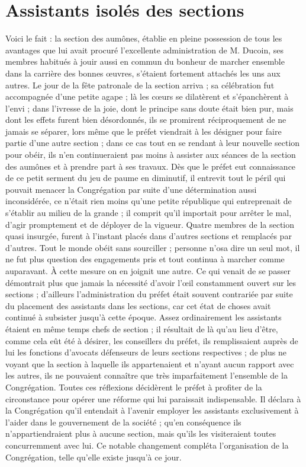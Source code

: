 \section*{Assistants isolés des sections}
Voici le fait : la section des aumônes, établie en pleine possession de tous les avantages que lui avait procuré l'excellente administration de M. Ducoin, ses membres habitués à jouir aussi en commun du bonheur de marcher ensemble dans la carrière des bonnes œuvres, s'étaient fortement attachés les uns aux autres. Le jour de la fête patronale de la section arriva ; sa célébration fut accompagnée d'une petite agape ; là les cœurs se dilatèrent et s'épanchèrent à l'envi ; dans l'ivresse de la joie, dont le principe sans doute était bien pur, mais dont les effets furent bien désordonnés, ils se promirent réciproquement de ne jamais se séparer, lors même que le préfet viendrait à les désigner pour faire partie d'une autre section ; dans ce cas tout en se rendant à leur nouvelle section pour obéir, ils n'en continueraient pas moins à assister aux séances de la section des aumônes et à prendre part à ses travaux. Dès que le préfet eut connaissance de ce petit serment du jeu de paume en diminutif, il entrevit tout le péril qui pouvait menacer la Congrégation par suite d'une détermination aussi inconsidérée, ce n'était rien moins qu'une petite république qui entreprenait de s'établir au milieu de la grande ; il comprit qu'il importait pour arrêter le mal, d'agir promptement et de déployer de la vigueur. Quatre
membres de la section quasi insurgée, furent à l'instant placés dans d'autres sections et remplacés par d'autres. Tout le monde obéit sans sourciller ; personne n'osa dire un seul mot, il ne fut plus question des engagements pris et tout continua à marcher comme auparavant. À cette mesure on en joignit une autre. Ce qui venait de se passer démontrait plus que jamais la nécessité d'avoir l'œil constamment ouvert sur les sections ; d'ailleurs l'administration du préfet était souvent contrariée par suite du placement des assistants dans les sections, car cet état de choses avait continué à subsister jusqu'à cette époque. Assez ordinairement les assistants étaient en même temps chefs de section ; il résultait de là qu'au lieu d'être, comme cela eût été à désirer, les conseillers du préfet, ils remplissaient auprès de lui les fonctions d'avocats défenseurs de leurs sections respectives ; de plus ne voyant que la section à laquelle ils appartenaient et n'ayant aucun rapport avec les autres, ils ne pouvaient connaître que très imparfaitement l'ensemble de la Congrégation. Toutes ces réflexions décidèrent le préfet à profiter de la circonstance pour opérer une réforme qui lui paraissait indispensable. Il déclara à la Congrégation qu'il entendait à l'avenir employer les assistants exclusivement à l'aider dans le gouvernement de la société ; qu'en conséquence ils n'appartiendraient plus à aucune section, mais qu'ils les visiteraient toutes concurremment avec lui. Ce notable changement compléta l'organisation de la Congrégation, telle qu'elle existe jusqu'à ce jour.

